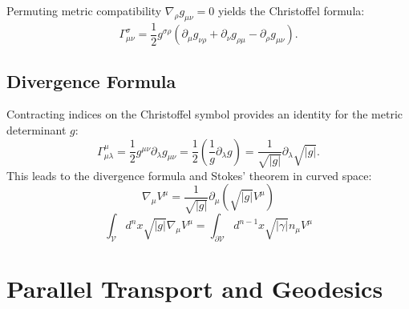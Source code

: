\documentclass[11pt, a4paper]{report}
\begin{document}
Permuting metric compatibility $\nabla_\rho g_{\mu\nu} = 0$ yields the Christoffel formula:
\begin{equation}\label{eq:christoffel_formula}
\Gamma^\sigma_{\mu\nu} = \frac{1}{2} g^{\sigma\rho} ( \partial_\mu g_{\nu\rho} + \partial_\nu g_{\rho\mu} - \partial_\rho g_{\mu\nu} ).
\end{equation}

\subsection*{Divergence Formula}
Contracting indices on the Christoffel symbol provides an identity for the metric determinant $g$:
\begin{equation}\label{eq:gamma_contracted}
\Gamma^\mu_{\mu\lambda} = \frac{1}{2} g^{\mu\nu} \partial_\lambda g_{\mu\nu} = \frac{1}{2} \left( \frac{1}{g} \partial_\lambda g \right) = \frac{1}{\sqrt{|g|}} \partial_\lambda \sqrt{|g|}.
\end{equation}
This leads to the divergence formula and Stokes' theorem in curved space:
\begin{equation}
\nabla_\mu V^\mu = \frac{1}{\sqrt{|g|}} \partial_\mu (\sqrt{|g|} V^\mu)
\end{equation}
\begin{equation}
\int_{\mathcal{V}} d^n x \sqrt{|g|} \nabla_\mu V^\mu = \int_{\partial \mathcal{V}} d^{n-1} x \sqrt{|\gamma|} n_\mu V^\mu
\end{equation}

\section{Parallel Transport and Geodesics}
\end{document}
